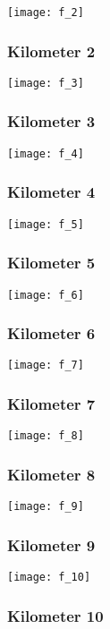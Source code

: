\documentclass[]{article}
\begin{document}
\texttt{[image: f\_2]}

\subsubsection{Kilometer 2}\label{kilometer-2-5}

\texttt{[image: f\_3]}

\subsubsection{Kilometer 3}\label{kilometer-3-5}

\texttt{[image: f\_4]}

\subsubsection{Kilometer 4}\label{kilometer-4-5}

\texttt{[image: f\_5]}

\subsubsection{Kilometer 5}\label{kilometer-5-5}

\texttt{[image: f\_6]}

\subsubsection{Kilometer 6}\label{kilometer-6-5}

\texttt{[image: f\_7]}

\subsubsection{Kilometer 7}\label{kilometer-7-5}

\texttt{[image: f\_8]}

\subsubsection{Kilometer 8}\label{kilometer-8-5}

\texttt{[image: f\_9]}

\subsubsection{Kilometer 9}\label{kilometer-9-4}

\texttt{[image: f\_10]}

\subsubsection{Kilometer 10}\label{kilometer-10-4}
\end{document}
